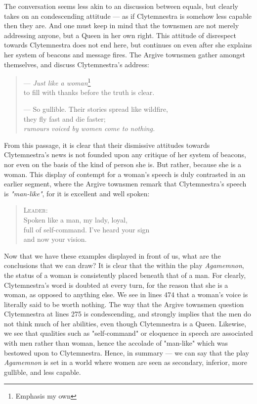 \noindent
The conversation seems less akin to an discussion between equals, but clearly
takes on an condescending attitude --- as if Clytemnestra is somehow less
capable then they are. And one must keep in mind that the townsmen are
not merely addressing anyone, but a Queen in her own right. This attitude of
disrespect towards Clytemnestra does not end here, but continues on even after
she explains her system of beacons and message fires. The Argive townsmen gather
amongst themselves, and discuss Clytemnestra's address:

\begin{quote}
  --- \emph{Just like a woman}\footnote{\label{note1}Emphasis my own} \\
  to fill with thanks before the truth is clear.

  --- So gullible. Their stories spread like wildfire, \\
  they fly fast and die faster; \\
  \emph{rumours voiced by women come to nothing.}\footnotemark[\ref{note1}]

  \autocite[474]{fagles}
\end{quote}

\noindent
From this passage, it is clear that their dismissive attitudes towards
Clytemnestra's news is not founded upon any critique of her system of beacons,
nor even on the basis of the kind of person she is. But rather, because she
is a woman. This display of contempt for a woman's speech is duly contrasted in
an earlier segment, where the Argive townsmen remark that Clytemnestra's
speech is \emph{"man-like"}, for it is excellent and well spoken:

\begin{quote}
  \textsc{Leader}: \\
  Spoken like a man, my lady, loyal, \\
  full of self-command. I've heard your sign \\
  and now your vision.

  \autocite[355]{fagles}
\end{quote}

Now that we have these examples displayed in front of us, what are the
conclusions that we can draw? It is clear that the within the play
\emph{Agamemnon}, the status of a woman is consistently placed beneath that of a
man. For clearly, Clytemnestra's word is doubted at every turn, for the reason
that she is a woman, as opposed to anything else. We see in lines 474 that a
woman's voice is literally said to be worth nothing. The way that the Argive
townsmen question Clytemnestra at lines 275 is condescending, and strongly
implies that the men do not think much of her abilities, even though
Clytemnestra is a Queen. Likewise, we see that qualities such as "self-command"
or eloquence in speech are associated with men rather than woman, hence the
accolade of "man-like" which was bestowed upon to Clytemnestra. Hence, in
summary --- we can say that the play \emph{Agamemnon} is set in a world where
women are seen as secondary, inferior, more gullible, and less capable.

